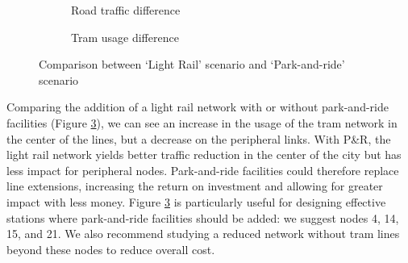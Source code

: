 \begin{figure}
    \centering
    \begin{subfigure}{0.33\textwidth}
        \centering
        \resizebox{\textwidth}{!}{}
        \caption{Road traffic difference}
        \label{fig:diff_sc23}
    \end{subfigure}%
    \begin{subfigure}{0.33\textwidth}
        \centering
        \resizebox{\textwidth}{!}{}
        \caption{Tram usage difference}
        \label{fig:diff_tram_sc23}
    \end{subfigure}
    \caption{Comparison between `Light Rail' scenario and `Park-and-ride' scenario}
    \label{fig:comp_sc23}
\end{figure}

Comparing the addition of a light rail network with or without park-and-ride facilities (Figure \ref{fig:comp_sc23}), we can see an increase in the usage of the tram network in the center of the lines, but a decrease on the peripheral links. With P\&R, the light rail network yields better traffic reduction in the center of the city but has less impact for peripheral nodes. Park-and-ride facilities could therefore replace line extensions, increasing the return on investment and allowing for greater impact with less money. Figure \ref{fig:comp_sc23} is particularly useful for designing effective stations where park-and-ride facilities should be added: we suggest nodes 4, 14, 15, and 21. We also recommend studying a reduced network without tram lines beyond these nodes to reduce overall cost.